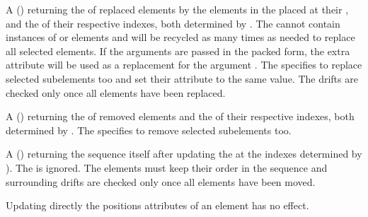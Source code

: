 \documentclass[letterpaper,10pt,english]{sphinxmanual}
\begin{document}
\begin{description}
\sphinxAtStartPar
A  () returning the  of replaced elements by the elements in the   placed at their {\hyperref[\detokenize{sequences:element-positions}]{}}, and the
 of their respective indexes, both determined by . The   cannot contain instances of  or 
elements and will be recycled as many times as needed to replace all selected elements. If the arguments are passed in the packed form, the extra attribute
 will be used as a replacement for the argument . The   specifies to replace selected sub\sphinxhyphen{}elements too and set
their  attribute to the same value. The  drifts are checked only once all elements have been replaced.

\sphinxAtStartPar
A  (\sphinxcode{\sphinxupquote{{[}rng{]}, {[}sel{]}}}) returning the  of removed elements and the  of their respective indexes, both determined by .
The   specifies to remove selected sub\sphinxhyphen{}elements too.

\sphinxAtStartPar
A  (\sphinxcode{\sphinxupquote{{[}rng{]}, {[}sel{]}}}) returning the sequence itself after updating the {\hyperref[\detokenize{sequences:element-positions}]{}} at the indexes determined by ).
The   is ignored. The elements must keep their order in the sequence and surrounding  drifts are checked only once all elements
have been moved. %
\begin{footnote}[3]\sphinxAtStartFootnote
Updating directly the positions attributes of an element has no effect.
%
\end{footnote}


\end{description}
\end{document}
